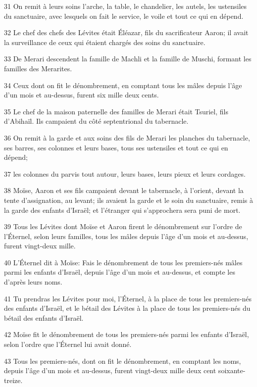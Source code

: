 \par 31 On remit à leurs soins l'arche, la table, le chandelier, les autels, les ustensiles du sanctuaire, avec lesquels on fait le service, le voile et tout ce qui en dépend.
\par 32 Le chef des chefs des Lévites était Éléazar, fils du sacrificateur Aaron; il avait la surveillance de ceux qui étaient chargés des soins du sanctuaire.
\par 33 De Merari descendent la famille de Machli et la famille de Muschi, formant les familles des Merarites.
\par 34 Ceux dont on fit le dénombrement, en comptant tous les mâles depuis l'âge d'un mois et au-dessus, furent six mille deux cents.
\par 35 Le chef de la maison paternelle des familles de Merari était Tsuriel, fils d'Abihaïl. Ils campaient du côté septentrional du tabernacle.
\par 36 On remit à la garde et aux soins des fils de Merari les planches du tabernacle, ses barres, ses colonnes et leurs bases, tous ses ustensiles et tout ce qui en dépend;
\par 37 les colonnes du parvis tout autour, leurs bases, leurs pieux et leurs cordages.
\par 38 Moïse, Aaron et ses fils campaient devant le tabernacle, à l'orient, devant la tente d'assignation, au levant; ils avaient la garde et le soin du sanctuaire, remis à la garde des enfants d'Israël; et l'étranger qui s'approchera sera puni de mort.
\par 39 Tous les Lévites dont Moïse et Aaron firent le dénombrement sur l'ordre de l'Éternel, selon leurs familles, tous les mâles depuis l'âge d'un mois et au-dessus, furent vingt-deux mille.
\par 40 L'Éternel dit à Moïse: Fais le dénombrement de tous les premiers-nés mâles parmi les enfants d'Israël, depuis l'âge d'un mois et au-dessus, et compte les d'après leurs noms.
\par 41 Tu prendras les Lévites pour moi, l'Éternel, à la place de tous les premiers-nés des enfants d'Israël, et le bétail des Lévites à la place de tous les premiers-nés du bétail des enfants d'Israël.
\par 42 Moïse fit le dénombrement de tous les premiers-nés parmi les enfants d'Israël, selon l'ordre que l'Éternel lui avait donné.
\par 43 Tous les premiers-nés, dont on fit le dénombrement, en comptant les noms, depuis l'âge d'un mois et au-dessus, furent vingt-deux mille deux cent soixante-treize.

